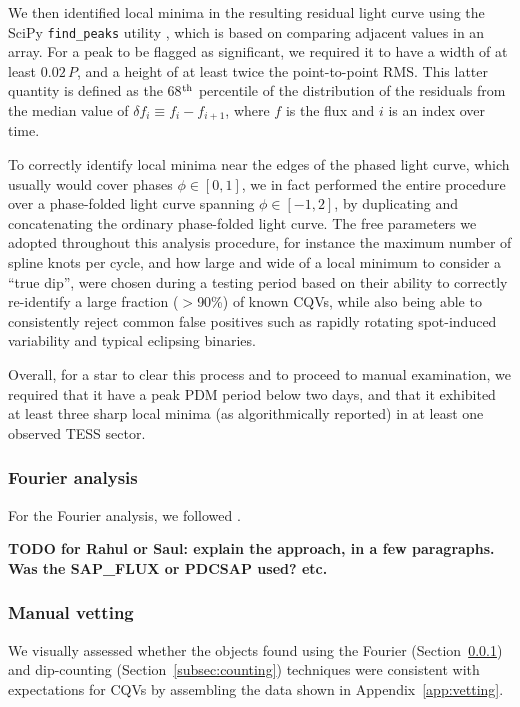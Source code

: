 \documentclass[11pt,twocolumn,tighten]{aastex63}
\begin{document}
We then identified local minima in the resulting residual light curve
using the SciPy \texttt{find\_peaks} utility
\citep{2020NatMe..17..261V}, which is based on comparing adjacent
values in an array.  For a peak to be flagged as significant, we
required it to have a width of at least $0.02\,P$, and a height of at
least twice the point-to-point RMS.  This latter quantity is defined
as the 68$^{\rm th}$ percentile of the distribution of the residuals
from the median value of $\delta f_i \equiv f_i - f_{i+1}$, where $f$
is the flux and $i$ is an index over time.

To correctly identify local minima near the edges of the phased light
curve, which usually would cover phases $\phi \in [ 0,1 ]$, we in fact
performed the entire procedure over a phase-folded light curve
spanning $\phi \in [-1,2 ]$, by duplicating and concatenating the
ordinary phase-folded light curve.  The free parameters we adopted
throughout this analysis procedure, for instance the maximum number of
spline knots per cycle, and how large and wide of a local minimum to
consider a ``true dip'', were chosen during a testing period based on
their ability to correctly re-identify a large fraction ($>$90\%) of
known CQVs, while also being able to consistently reject common false
positives such as rapidly rotating spot-induced variability and
typical eclipsing binaries.

Overall, for a star to clear this process and to proceed to manual
examination, we required that it have a peak PDM period below two
days, and that it exhibited at least three sharp local minima (as
algorithmically reported) in at least one observed TESS sector.



\subsubsection{Fourier analysis}
\label{subsec:fourier}
For the Fourier analysis, we followed \citet{2019ApJ...876..127Z}.

{\bf TODO for Rahul or Saul: explain the approach, in a few
	paragraphs.  Was the SAP\_FLUX or PDCSAP used? etc. }

\subsubsection{Manual vetting}

We visually assessed whether the objects found using the Fourier
(Section~\ref{subsec:fourier}) and dip-counting
(Section~\ref{subsec:counting}) techniques were consistent with
expectations for CQVs by assembling the data shown in
Appendix~\ref{app:vetting}.
\end{document}
